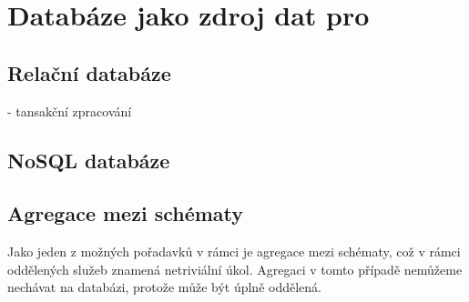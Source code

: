 
\section{Databáze jako zdroj dat pro }

\subsection{Relační databáze}
- tansakční zpracování


\subsection{NoSQL databáze}



\subsection{Agregace mezi schématy}
Jako jeden z možných pořadavků v rámci  je agregace mezi schématy, což v rámci oddělených služeb znamená netriviální úkol.
Agregaci v tomto případě nemůžeme nechávat na databázi, protože může být úplně oddělená.
